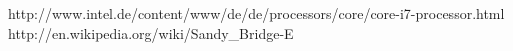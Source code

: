 \documentclass[10pt]{article}
\begin{document}
\begin{enumerate}[label=\alph*)]
	http://www.intel.de/content/www/de/de/processors/core/core-i7-processor.html\\
	http://en.wikipedia.org/wiki/Sandy\_Bridge-E\\
\end{enumerate}
\end{document}
